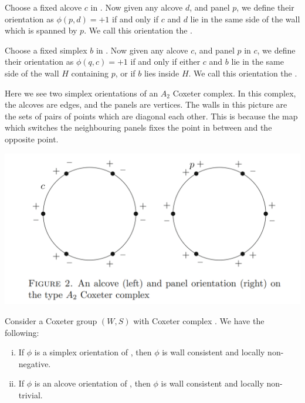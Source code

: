 \documentclass[11pt]{article}
\begin{document}
\begin{definition}
    Choose a fixed alcove $c$ in \sg. Now given any alcove $d$, and panel $p$, we define their orientation as $\phi(p,d)=+1$ if and only if $c$ and $d$ lie in the same side of the wall which is spanned by $p$. We call this orientation the .
\end{definition}


\begin{definition}
    Choose a fixed simplex $b$ in \sg. Now given any alcove $c$, and panel $p$ in $c$, we define their orientation as $\phi(q,c)=+1$ if and only if either $c$ and $b$ lie in the same side of the wall $H$ containing $p$, or if $b$ lies inside $H$. We call this orientation the .
\end{definition}
\begin{example}
    Here we see two simplex orientations of an $A_2$ Coxeter complex. In this complex, the alcoves are edges, and the panels are vertices. The walls in this picture are the sets of pairs of points which are diagonal each other. This is because the map which switches the neighbouring panels fixes the point in between and the opposite point. 
\end{example}
\begin{center}
\includegraphics[scale=0.6]{Screenshot 2023-02-03 102201.png}\\
\end{center}
\begin{lemma}
    Consider a Coxeter group $(W,S)$ with Coxeter complex \sg. We have the following:
    \begin{enumerate}[(i)]
        \item If $\phi$ is a simplex orientation of \sg, then $\phi$ is wall consistent and locally non-negative.
        \item If $\phi$ is an alcove orientation of \sg, then $\phi$ is wall consistent and locally non-trivial.
    \end{enumerate}
\end{lemma}
\end{document}
